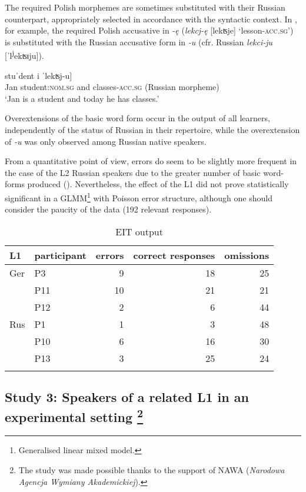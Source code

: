 \documentclass[output=paper,            colorlinks, citecolor=brown            		  ]{langscibook}
\begin{document}
The required Polish morphemes are sometimes substituted with their Russian counterpart, appropriately selected in accordance with the syntactic context. In , for example, the required Polish accusative in \textit{{}-ę} (\textit{lekcj-ę} [lekʦje] ‘lesson-\textsc{acc.sg}’) is substituted with the Russian accusative form in \textit{{}-u} (cfr. Russian \textit{lekci-ju} [ˈl\textsuperscript{j}ekʦɪju]).

\ea\label{ex:saturno:24}  
\gll {[jan}   stuˈdent     i   {{}ˈlekʦj-u]}\\
  Jan  student:\textsc{nom.sg}  and  {classes-\textsc{acc.sg} (Russian morpheme)}\\ 
 \glt ‘Jan is a student and today he has classes.’
\z

Overextensions of the basic word form occur in the output of all learners, independently of the status of Russian in their repertoire, while the overextension of \textit{{}-u} was only observed among Russian native speakers. 

From a quantitative point of view, errors do seem to be slightly more frequent in the case of the L2 Russian speakers due to the greater number of basic word-forms produced (). Nevertheless, the effect of the L1 did not prove statistically significant in a GLMM\footnote{{Generalised linear mixed model.}} with Poisson error structure, although one should consider the paucity of the data (192 relevant responses). 

\begin{table}
\begin{tabular}{llrrr}

\lsptoprule

L1 & participant & errors & correct responses & omissions\\
\midrule
Ger & P3 & 9 & 18 & 25\\
& P11 & 10 & 21 & 21\\
& P12 & 2 & 6 & 44\\
Rus & P1 & 1 & 3 & 48\\
& P10 & 6 & 16 & 30\\
& P13 & 3 & 25 & 24\\
\lspbottomrule
\end{tabular}
\caption{EIT output}
\label{tab:saturno:2}
\end{table}

\subsection{Study 3: Speakers of a related L1 in an experimental setting \citep{Saturno2023}\protect\footnote{The study was made possible thanks to the support of NAWA (\textit{Narodowa Agencja Wymiany Akademickiej}).}}
\label{sec:saturno:3.4}
\end{document}
